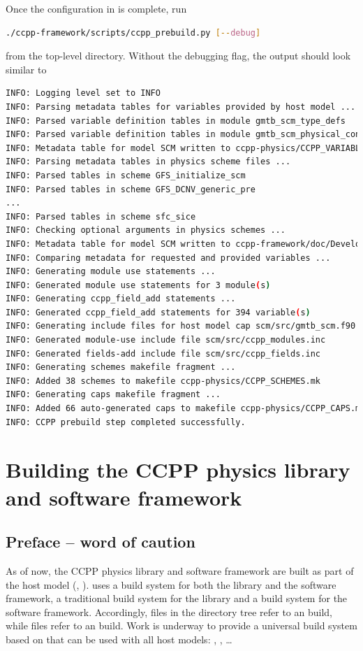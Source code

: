 Once the configuration in  is complete, run
\begin{lstlisting}[language=bash]
./ccpp-framework/scripts/ccpp_prebuild.py [--debug]
\end{lstlisting}
from the top-level directory. Without the debugging flag, the output should look similar to
\begin{lstlisting}[language=bash,basicstyle=\scriptsize\ttfamily]
INFO: Logging level set to INFO
INFO: Parsing metadata tables for variables provided by host model ...
INFO: Parsed variable definition tables in module gmtb_scm_type_defs
INFO: Parsed variable definition tables in module gmtb_scm_physical_constants
INFO: Metadata table for model SCM written to ccpp-physics/CCPP_VARIABLES.html
INFO: Parsing metadata tables in physics scheme files ...
INFO: Parsed tables in scheme GFS_initialize_scm
INFO: Parsed tables in scheme GFS_DCNV_generic_pre
...
INFO: Parsed tables in scheme sfc_sice
INFO: Checking optional arguments in physics schemes ...
INFO: Metadata table for model SCM written to ccpp-framework/doc/DevelopersGuide/CCPP_VARIABLES.tex
INFO: Comparing metadata for requested and provided variables ...
INFO: Generating module use statements ...
INFO: Generated module use statements for 3 module(s)
INFO: Generating ccpp_field_add statements ...
INFO: Generated ccpp_field_add statements for 394 variable(s)
INFO: Generating include files for host model cap scm/src/gmtb_scm.f90 ...
INFO: Generated module-use include file scm/src/ccpp_modules.inc
INFO: Generated fields-add include file scm/src/ccpp_fields.inc
INFO: Generating schemes makefile fragment ...
INFO: Added 38 schemes to makefile ccpp-physics/CCPP_SCHEMES.mk
INFO: Generating caps makefile fragment ...
INFO: Added 66 auto-generated caps to makefile ccpp-physics/CCPP_CAPS.mk
INFO: CCPP prebuild step completed successfully.
\end{lstlisting}

\section{Building the CCPP physics library and software framework}
\label{sec_ccpp_build}
\subsection{Preface -- word of caution}
As of now, the CCPP physics library and software framework are built as part of the host model (, ).  uses a  build system for both the library and the software framework,  a traditional  build system for the library and a  build system for the software framework. Accordingly,  files in the  directory tree refer to an  build, while  files refer to an  build. Work is underway to provide a universal build system based on  that can be used with all host models: , , \dots

